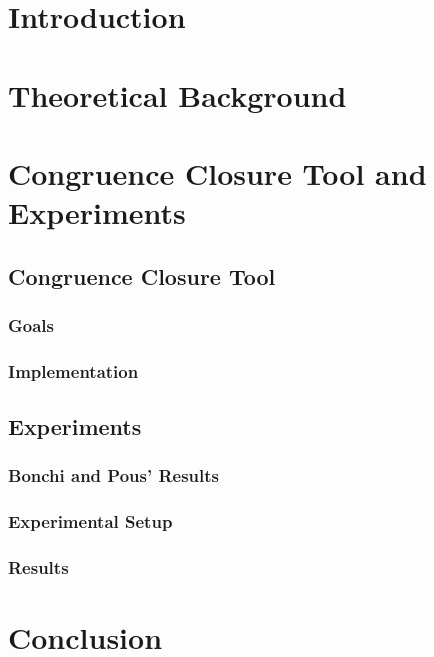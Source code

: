 
\chapter{Introduction}

\chapter{Theoretical Background}



\chapter{Congruence Closure Tool and Experiments}

\section{Congruence Closure Tool}

\subsection{Goals}

\subsection{Implementation}

\section{Experiments}

\subsection{Bonchi and Pous' Results}

\subsection{Experimental Setup}

\subsection{Results}

\chapter{Conclusion}
